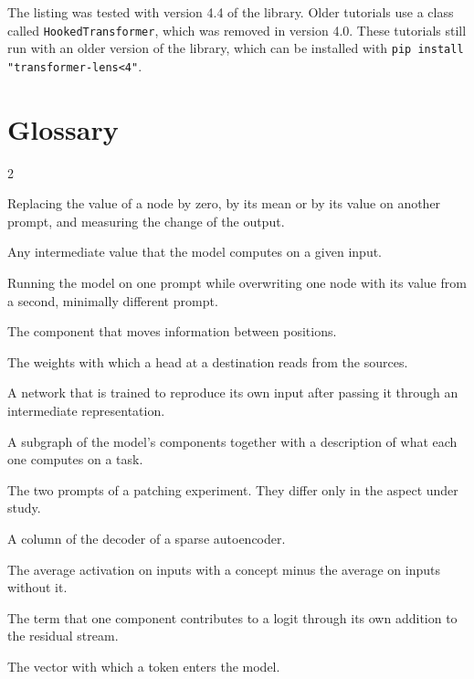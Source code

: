 

The listing was tested with version 4.4 of the library. Older tutorials use a class called
\texttt{HookedTransformer}, which was removed in version 4.0. These tutorials still run with an older version of
the library, which can be installed with \texttt{pip install "transformer-lens<4"}.

\section{Glossary}
\label{app:glossary}

{\small \setlength{\columnsep}{20pt}
\begin{multicols}{2}
\begin{description}[style=sameline, leftmargin=0pt, itemsep=1.5pt, font=\normalfont\bfseries]
\item[Ablation.] Replacing the value of a node by zero, by its mean or by its value on another prompt, and
measuring the change of the output.
\item[Activation.] Any intermediate value that the model computes on a given input.
\item[Activation patching.] Running the model on one prompt while overwriting one node with its value from a
second, minimally different prompt.
\item[Attention head.] The component that moves information between positions.
\item[Attention pattern.] The weights with which a head at a destination reads from the sources.
\item[Autoencoder.] A network that is trained to reproduce its own input after passing it through an
intermediate representation.
\item[Circuit.] A subgraph of the model's components together with a description of what each one computes on
a task.
\item[Clean and corrupted prompt.] The two prompts of a patching experiment. They differ only in the aspect
under study.
\item[Dictionary direction.] A column of the decoder of a sparse autoencoder.
\item[Difference of means.] The average activation on inputs with a concept minus the average on inputs
without it.
\item[Direct logit attribution.] The term that one component contributes to a logit through its own addition
to the residual stream.
\item[Embedding.] The vector with which a token enters the model.

\end{description}
\end{multicols}}
